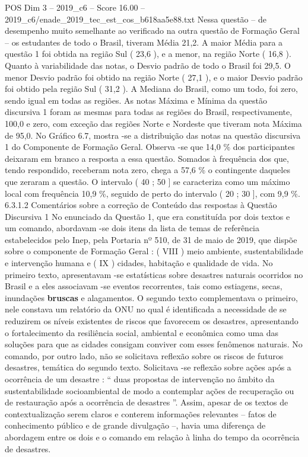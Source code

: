 \begin{textsample}{POS Dim 3 – 2019\_c6 – Score 16.00 – 2019\_c6/enade\_2019\_tec\_est\_cos\_b618aa5e88.txt}
Nessa questão – de desempenho muito semelhante ao verificado na outra questão de Formação Geral – os estudantes de todo o Brasil, tiveram Média 21,2.
A maior Média para a questão 1 foi obtida na região Sul ( 23,6 ), e a menor, na região Norte ( 16,8 ).
Quanto à variabilidade das notas, o Desvio padrão de todo o Brasil foi 29,5.
O menor Desvio padrão foi obtido na região Norte ( 27,1 ), e o maior Desvio padrão foi obtido pela região Sul ( 31,2 ).
A Mediana do Brasil, como um todo, foi zero, sendo igual em todas as regiões.
As notas Máxima e Mínima da questão discursiva 1 foram as mesmas para todas as regiões do Brasil, respectivamente, 100,0 e zero, com exceção das regiões Norte e Nordeste que tiveram nota Máxima de 95,0.
No Gráfico 6.7, mostra -se a distribuição das notas na questão discursiva 1 do Componente de Formação Geral.
Observa -se que 14,0 \% dos participantes deixaram em branco a resposta a essa questão.
Somados à frequência dos que, tendo respondido, receberam nota zero, chega a 57,6 \% o contingente daqueles que zeraram a questão.
O intervalo ( 40 ; 50 ] se caracteriza como um máximo local com frequência 10,9 \%, seguido de perto do intervalo ( 20 ; 30 ], com 9,9 \%. 6.3.1.2 Comentários sobre a correção de Conteúdo das respostas à Questão Discursiva 1 No enunciado da Questão 1, que era constituída por dois textos e um comando, abordavam -se dois itens da lista de temas de referência estabelecidos pelo Inep, pela Portaria nº 510, de 31 de maio de 2019, que dispõe sobre o componente de Formação Geral : ( VIII ) meio ambiente, sustentabilidade e intervenção humana e ( IX ) cidades, habitação e qualidade de vida.
No primeiro texto, apresentavam -se estatísticas sobre desastres naturais ocorridos no Brasil e a eles associavam -se eventos recorrentes, tais como estiagens, secas, inundações \textbf{bruscas} e alagamentos.
O segundo texto complementava o primeiro, nele constava um relatório da ONU no qual é identificada a necessidade de se reduzirem os níveis existentes de riscos que favorecem os desastres, apresentando o fortalecimento da resiliência social, ambiental e econômica como uma das soluções para que as cidades consigam conviver com esses fenômenos naturais.
No comando, por outro lado, não se solicitava reflexão sobre os riscos de futuros desastres, temática do segundo texto.
Solicitava -se reflexão sobre ações após a ocorrência de um desastre : “ duas propostas de intervenção no âmbito da sustentabilidade socioambiental de modo a contemplar ações de recuperação ou de restauração após a ocorrência de desastres ”.
Assim, apesar de os textos de contextualização serem claros e conterem informações relevantes – fatos de conhecimento público e de grande divulgação –, havia uma diferença de abordagem entre os dois e o comando em relação à linha do tempo da ocorrência de desastres.

\end{textsample}
